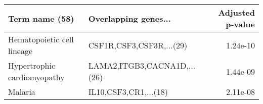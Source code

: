 \begin{tabular}{llr}
\toprule
             Term name (58) &        Overlapping genes... &  Adjusted p-value \\
\midrule
 Hematopoietic cell lineage &    CSF1R,CSF3,CSF3R,...(29) &          1.24e-10 \\
Hypertrophic cardiomyopathy & LAMA2,ITGB3,CACNA1D,...(26) &          1.44e-09 \\
                    Malaria &       IL10,CSF3,CR1,...(18) &          2.11e-08 \\
\bottomrule
\end{tabular}
